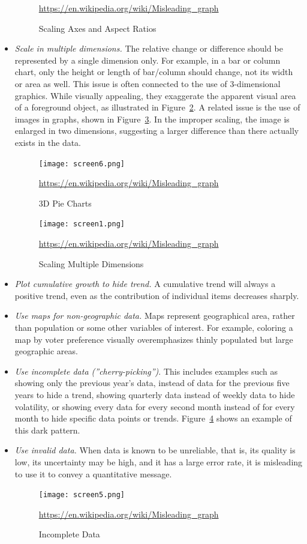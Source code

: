 \begin{itemize}
\begin{figure}
\scriptsize\url{https://en.wikipedia.org/wiki/Misleading_graph}
\caption{Scaling Axes and Aspect Ratios}
\label{fig:aspectratios}
\end{figure}
	\item \emph{Scale in multiple dimensions.} The relative change or difference should be represented by a single dimension only. For example, in a bar or column chart, only the height or length of bar/column should change, not its width or area as well. This issue is often connected to the use of 3-dimensional graphics. While visually appealing, they exaggerate the apparent visual area of a foreground object, as illustrated in Figure~\ref{fig:3dpie}. A related issue is the use of images in graphs, shown in Figure~\ref{fig:imagesgraphs}. In the improper scaling, the image is enlarged in two dimensions, suggesting a larger difference than there actually exists in the data.
\begin{figure}
\centering
\texttt{[image: screen6.png]}

\scriptsize\url{https://en.wikipedia.org/wiki/Misleading_graph}
\caption{3D Pie Charts}
\label{fig:3dpie}
\end{figure}
\begin{figure}
\centering
\texttt{[image: screen1.png]}

\scriptsize\url{https://en.wikipedia.org/wiki/Misleading_graph}
\caption{Scaling Multiple Dimensions}
\label{fig:imagesgraphs}
\end{figure}
	\item \emph{Plot cumulative growth to hide trend.} A cumulative trend will always a positive trend, even as the contribution of individual items decreases sharply.
	\item \emph{Use maps for non-geographic data.} Maps represent geographical area, rather than population or some other variables of interest. For example, coloring a map by voter preference visually overemphasizes thinly populated but large geographic areas.
	\item \emph{Use incomplete data (''cherry-picking'')}. This includes examples such as showing only the previous year's data, instead of data for the previous five years to hide a trend, showing quarterly data instead of weekly data to hide volatility, or showing every data for every second month instead of for every month to hide specific data points or trends. Figure~\ref{fig:omitted} shows an example of this dark pattern.
	\item \emph{Use invalid data.} When data is known to be unreliable, that is, its quality is low, its uncertainty may be high, and it has a large error rate, it is misleading to use it to convey a quantitative message. 
\begin{figure}
\centering
\texttt{[image: screen5.png]}

\scriptsize\url{https://en.wikipedia.org/wiki/Misleading_graph}
\caption{Incomplete Data}
\label{fig:omitted}
\end{figure}

\end{itemize}	

